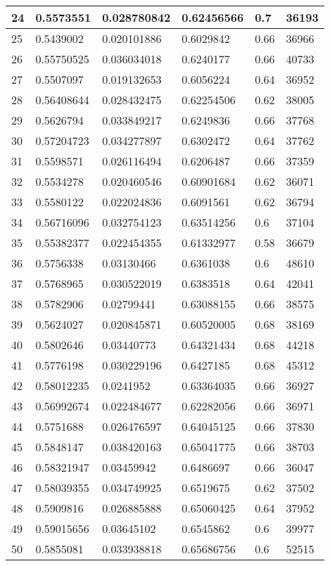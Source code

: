 \begin{longtable}{|l|l|l|l|l|l|}
24 & 0.5573551 & 0.028780842 & 0.62456566 & 0.7 & 36193 \\ \hline 
25 & 0.5439002 & 0.020101886 & 0.6029842 & 0.66 & 36966 \\ \hline 
26 & 0.55750525 & 0.036034018 & 0.6240177 & 0.66 & 40733 \\ \hline 
27 & 0.5507097 & 0.019132653 & 0.6056224 & 0.64 & 36952 \\ \hline 
28 & 0.56408644 & 0.028432475 & 0.62254506 & 0.62 & 38005 \\ \hline 
29 & 0.5626794 & 0.033849217 & 0.6249836 & 0.66 & 37768 \\ \hline 
30 & 0.57204723 & 0.034277897 & 0.6302472 & 0.64 & 37762 \\ \hline 
31 & 0.5598571 & 0.026116494 & 0.6206487 & 0.66 & 37359 \\ \hline 
32 & 0.5534278 & 0.020460546 & 0.60901684 & 0.62 & 36071 \\ \hline 
33 & 0.5580122 & 0.022024836 & 0.6091561 & 0.62 & 36794 \\ \hline 
34 & 0.56716096 & 0.032754123 & 0.63514256 & 0.6 & 37104 \\ \hline 
35 & 0.55382377 & 0.022454355 & 0.61332977 & 0.58 & 36679 \\ \hline 
36 & 0.5756338 & 0.03130466 & 0.6361038 & 0.6 & 48610 \\ \hline 
37 & 0.5768965 & 0.030522019 & 0.6383518 & 0.64 & 42041 \\ \hline 
38 & 0.5782906 & 0.02799441 & 0.63088155 & 0.66 & 38575 \\ \hline 
39 & 0.5624027 & 0.020845871 & 0.60520005 & 0.68 & 38169 \\ \hline 
40 & 0.5802646 & 0.03440773 & 0.64321434 & 0.68 & 44218 \\ \hline 
41 & 0.5776198 & 0.030229196 & 0.6427185 & 0.68 & 45312 \\ \hline 
42 & 0.58012235 & 0.0241952 & 0.63364035 & 0.66 & 36927 \\ \hline 
43 & 0.56992674 & 0.022484677 & 0.62282056 & 0.66 & 36971 \\ \hline 
44 & 0.5751688 & 0.026476597 & 0.64045125 & 0.66 & 37830 \\ \hline 
45 & 0.5848147 & 0.038420163 & 0.65041775 & 0.66 & 38703 \\ \hline 
46 & 0.58321947 & 0.03459942 & 0.6486697 & 0.66 & 36047 \\ \hline 
47 & 0.58039355 & 0.034749925 & 0.6519675 & 0.62 & 37502 \\ \hline 
48 & 0.5909816 & 0.026885888 & 0.65060425 & 0.64 & 37952 \\ \hline 
49 & 0.59015656 & 0.03645102 & 0.6545862 & 0.6 & 39977 \\ \hline 
50 & 0.5855081 & 0.033938818 & 0.65686756 & 0.6 & 52515 \\ \hline 
\end{longtable}